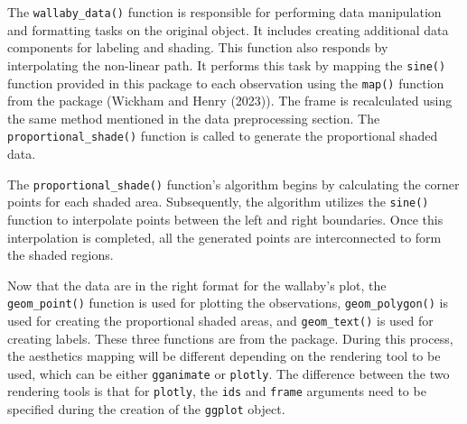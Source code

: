 The \texttt{wallaby\_data()} function is responsible for performing data manipulation and formatting tasks on the original object. It includes creating additional data components for labeling and shading. This function also responds by interpolating the non-linear path. It performs this task by mapping the \texttt{sine()} function provided in this package to each observation using the \texttt{map()} function from the  package (Wickham and Henry (2023)). The frame is recalculated using the same method mentioned in the data preprocessing section. The \texttt{proportional\_shade()} function is called to generate the proportional shaded data.

The \texttt{proportional\_shade()} function's algorithm begins by calculating the corner points for each shaded area. Subsequently, the algorithm utilizes the \texttt{sine()} function to interpolate points between the left and right boundaries. Once this interpolation is completed, all the generated points are interconnected to form the shaded regions.

Now that the data are in the right format for the wallaby's plot, the \texttt{geom\_point()} function is used for plotting the observations, \texttt{geom\_polygon()} is used for creating the proportional shaded areas, and \texttt{geom\_text()} is used for creating labels. These three functions are from the  package. During this process, the aesthetics mapping will be different depending on the rendering tool to be used, which can be either \texttt{gganimate} or \texttt{plotly}. The difference between the two rendering tools is that for \texttt{plotly}, the \texttt{ids} and \texttt{frame} arguments need to be specified during the creation of the \texttt{ggplot} object.

